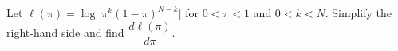 \documentclass[border=3bp]{standalone}
\begin{document}
\begin{minipage}{3.5in}
Let $\ell(\pi) = \log\bigl[\pi^k (1 - \pi)^{N - k}\bigr]$ for $0 < \pi < 1$ and $0 < k < N$. Simplify the right-hand side and find $\dfrac{d \ell(\pi)}{d\pi}$.
\end{minipage}
\end{document}
